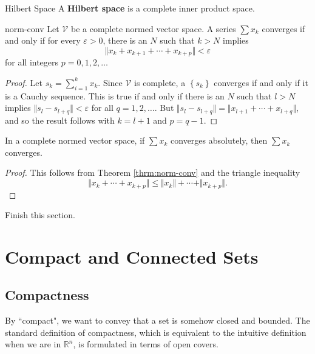 \documentclass[10pt]{report}
\begin{document}
\begin{defn}{Hilbert Space}{}
A \textbf{Hilbert space} is a complete inner product space.
\end{defn}


\begin{thrm}{}{norm-conv}
	Let $\mathcal{V}$ be a complete normed vector space. A series $\sum x_k $ converges if and only if for every $\varepsilon>0$, there is an $N$ such that $k  >N$ implies
	\[
	\Vert{x_k + x_{k+1}+\cdots+x_{k+p}}\Vert<\varepsilon
	\] 
	for all integers $p=0,1,2,\dots$
\end{thrm}
\begin{proof}
	Let $s_k = \sum_{i=1}^{k} x_k$. Since $\mathcal{V}$ is complete, a $\left\{ s_k \right\}$ converges if and only if it is a Cauchy sequence. This is true if and only if there is an $N$ such that $l > N$ implies $\Vert{s_l - s_{l+q}}\Vert <\varepsilon$ for all $q=1,2,\dots$. But $\Vert{s_l - s_{l+q}}\Vert=\Vert{x_{l+1}+\cdots+x_{l+q}}\Vert$, and so the result follows with $k=l+1$ and $p=q-1$.
\end{proof}

\begin{thrm}{}{}
In a complete normed vector space, if $\sum x_k$ converges absolutely, then $\sum x_k$ converges.
\end{thrm}
\begin{proof}
	This follows from Theorem \ref{thrm:norm-conv} and the triangle inequality
	 \[
	\Vert{x_k + \cdots + x_{k+p}}\Vert \leq \Vert{x_k}\Vert+\cdots+\Vert{x_{k+p}}\Vert.
	\] 
\end{proof}


{\color{red}Finish this section.}



\chapter{Compact and Connected Sets}


\section{Compactness}

By ``compact", we want to convey that a set is somehow closed and bounded. The standard definition of compactness, which is equivalent to the intuitive definition when we are in $\mathbb{R}^n$, is formulated in terms of open covers.
\end{document}
